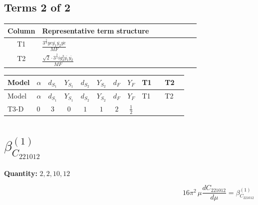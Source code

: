 \documentclass[8pt]{article}
\begin{document}
\begin{landscape}
\subsection*{Terms 2 of 2}
\begin{center}
\begin{tabular}{@{}c >{\raggedright\arraybackslash}p{0.82\linewidth}@{}}
\toprule
Column & Representative term structure \\
\midrule
T1 & \(\displaystyle \frac{3^{\frac{3}{4}} ye \overline{y_{1}} \overline{y_{2}} \overline{ye}}{MF}\) \\
\midrule
T2 & \(\displaystyle \frac{\sqrt{2} \cdot 3^{\frac{3}{4}} i g_{2}^{2} \overline{y_{1}} \overline{y_{2}}}{MF}\) \\
\midrule
\bottomrule
\end{tabular}
\end{center}
\smallskip
\tiny
\begin{longtable}{@{}llcccccc >{\raggedright\arraybackslash}p{0.21\linewidth} >{\raggedright\arraybackslash}p{0.21\linewidth}@{}}
\toprule
Model & $\alpha$ & $d_{S_1}$ & $Y_{S_1}$ & $d_{S_2}$ & $Y_{S_2}$ & $d_F$ & $Y_F$ & T1 & T2 \\
\midrule
\endfirsthead
\toprule
Model & $\alpha$ & $d_{S_1}$ & $Y_{S_1}$ & $d_{S_2}$ & $Y_{S_2}$ & $d_F$ & $Y_F$ & T1 & T2 \\
\midrule
\endhead
T3-D & $0$ & $3$ & $0$ & $1$ & $1$ & $2$ & $\frac{1}{2}$ & \scriptsize\adjustbox{max width=\linewidth}{$\begin{gathered} \frac{3^{\frac{3}{4}} ye \overline{y_{1}} \overline{y_{2}} \overline{ye}}{12 MF}\end{gathered}$} & \scriptsize\adjustbox{max width=\linewidth}{$\begin{gathered} \frac{\sqrt{2} \cdot 3^{\frac{3}{4}} i g_{2}^{2} \overline{y_{1}} \overline{y_{2}}}{3 MF}\end{gathered}$} \\
\midrule
\bottomrule
\end{longtable}
\clearpage
\section*{$\beta_{C_{221012}}^{(1)}$}
\noindent\textbf{Quantity: }$\mathrm{2,2,10,12}$\par\smallskip
\[16\pi^2\,\mu\frac{d C_{221012}}{d\mu}=\beta_{C_{221012}}^{(1)}\]

\end{landscape}
\end{document}
